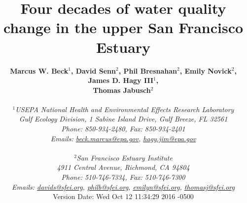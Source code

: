 \documentclass[letterpaper,12pt,oneside]{article}\usepackage[]{graphicx}\usepackage[]{color}
\begin{document}
\raggedbottom
\linenumbers
\raggedright
{}
\setlength{\parindent}{0.5in}
\renewcommand\refname{References \vspace{12pt}}

\begin{singlespace}
\title{{\bf {\Large Four decades of water quality change in the upper San Francisco Estuary}}}
\author{
  {\bf {\normalsize Marcus W. Beck$^1$, David Senn$^2$, Phil Bresnahan$^2$, Emily Novick$^2$, James D. Hagy III$^1$,}}
  \\{\bf {\normalsize Thomas Jabusch$^2$}}
  \\\\{\textit {\normalsize $^1$USEPA National Health and Environmental Effects Research Laboratory}}
  \\{\textit {\normalsize Gulf Ecology Division, 1 Sabine Island Drive, Gulf Breeze, FL 32561}}
	\\{\textit {\normalsize Phone: 850-934-2480, Fax: 850-934-2401}}
	\\{\textit {\normalsize Emails: \href{mailto:beck.marcus@epa.gov}{beck.marcus@epa.gov}, \href{mailto:hagy.jim@epa.gov}{hagy.jim@epa.gov}}}
  \\\\{\textit {\normalsize $^2$San Francisco Estuary Institute}}
	\\{\textit {\normalsize 4911 Central Avenue, Richmond, CA 94804}}
	\\{\textit {\normalsize Phone: 510-746-7334, Fax: 510-746-7300}}
	\\{\textit {\normalsize Emails: \href{mailto:davids@sfei.org}{davids@sfei.org}, \href{mailto:philb@sfei.org}{philb@sfei.org}, \href{mailto:emilyn@sfei.org}{emilyn@sfei.org}, \href{mailto:thomasj@sfei.org}{thomasj@sfei.org}}}
  \vspace{1in} 
  \\ Version Date:   Wed Oct 12 11:34:29 2016 -0500
	}
\date{}
\maketitle
\end{singlespace}
\clearpage
\end{document}
